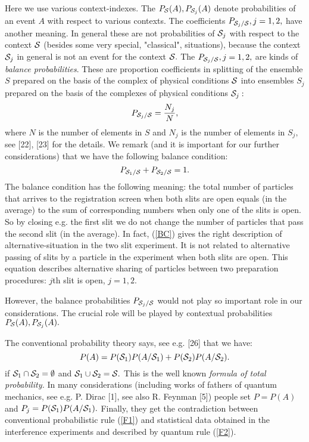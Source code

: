 \documentclass[12pt,oneside,final,a4paper]{article}
\begin{document}
Here we use various context-indexes. The $P_{{\cal S}}(A), P_{{\cal S}_j}(A)$ denote probabilities
of an event $A$ with respect to various contexts. The coefficients 
$P_{{\cal S}_j/{\cal S}}, j=1,2,$ have another
meaning. In general these
are not probabilities of ${\cal S}_j$ with respect to the context ${\cal S}$
(besides some very special, "classical", situations), because the context
${\cal S}_j$ in general is not an event for the context ${\cal S}.$
The $P_{{\cal S}_j/{\cal S}}, j=1,2,$
are kinds of {\it balance probabilities}. These are proportion coefficients in splitting
of the ensemble $S$ prepared on the basis of the complex of physical conditions ${\cal S}$
into ensembles $S_j$ prepared on the basis of the complexes of physical conditions ${\cal S}_j:$
\begin{equation}
\label{BP}
P_{{\cal S}_j/{\cal S}}= \frac{N_j}{N},
\end{equation}
where $N$ is the number of elements in $S$ and $N_j$ 
is the number of elements in $S_j,$ see [22], [23] for the details.
We remark (and it is important for our
further considerations) that we have the following balance condition:
\begin{equation}
\label{BC}
P_{{\cal S}_1/{\cal S}} + P_{{\cal S}_2/{\cal S}} =1.
\end{equation}
The balance condition has the following meaning: the total number of particles that
arrives to the registration screen when both slits are open equals (in the average)
to the sum of corresponding numbers when only one of the slits is open. So by closing e.g. the first
slit we do not change the number of particles that pass the second slit (in the average).
In fact, (\ref{BC}) gives the right description of alternative-situation in the two slit
experiment. It is not related to alternative passing of slits by a particle in the experiment
when both slits are open. This equation describes alternative sharing of particles between
two preparation procedures: $j$th slit is open, $j=1,2.$

However, the balance probabilities $P_{{\cal S}_j/{\cal S}}$  would not play 
so important role in our considerations. The crucial role will be played by contextual
probabilities $P_{{\cal S}}(A), P_{{\cal S}_j}(A).$ 





The conventional probability theory says, see e.g. [26] 
that we have:
\begin{equation}
\label{FT}
P(A)= P({\cal S}_1) P(A/{\cal S}_1) + P({\cal S}_2) P(A/{\cal S}_2).
\end{equation}
if ${\cal S}_1\cap {\cal S}_2 = \emptyset$ and ${\cal S}_1\cup {\cal S}_2 ={\cal S}.$
This is the well known {\it formula of total probability.}
In many considerations (including works of fathers 
of quantum mechanics, see e.g. P. Dirac [1], see also R. Feynman [5]) people 
set $P=P(A)$ and $P_j= P({\cal S}_1) P(A/{\cal S}_1).$
Finally, they get the contradiction between conventional
probabilistic rule (\ref{F1}) and statistical data obtained
in the interference experiments and described by quantum rule (\ref{F2}).
\end{document}
